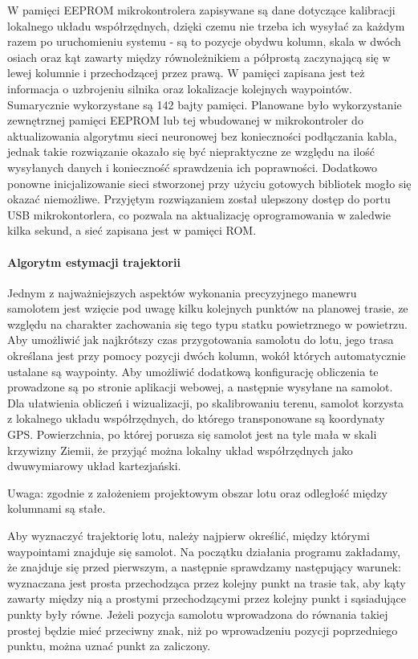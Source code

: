 \documentclass[12pt, a4paper]{article}
\begin{document}
W pamięci EEPROM mikrokontrolera zapisywane są dane dotyczące kalibracji lokalnego  układu współrzędnych, dzięki czemu nie trzeba ich wysyłać za każdym razem po uruchomieniu systemu - są to pozycje obydwu kolumn, skala w dwóch osiach oraz kąt zawarty między równoleżnikiem a półprostą zaczynającą się w lewej kolumnie i przechodzącej przez prawą. W pamięci zapisana jest też informacja o uzbrojeniu silnika oraz lokalizacje kolejnych waypointów. Sumarycznie wykorzystane są 142 bajty pamięci. Planowane było wykorzystanie zewnętrznej pamięci EEPROM lub tej wbudowanej w mikrokontroler do aktualizowania algorytmu sieci neuronowej bez konieczności podłączania kabla, jednak takie rozwiązanie okazało się być niepraktyczne ze względu na ilość wysyłanych danych i konieczność sprawdzenia ich poprawności. Dodatkowo ponowne inicjalizowanie sieci stworzonej przy użyciu gotowych bibliotek mogło się okazać niemożliwe. Przyjętym rozwiązaniem został ulepszony dostęp do portu USB mikrokontorlera, co pozwala na aktualizację oprogramowania w zaledwie kilka sekund, a sieć zapisana jest w pamięci ROM.

\FloatBarrier
\paragraph{Algorytm estymacji trajektorii}\mbox{}

Jednym z najważniejszych aspektów wykonania precyzyjnego manewru samolotem jest wzięcie pod uwagę kilku kolejnych punktów na planowej trasie, ze względu na charakter zachowania się tego typu statku powietrznego w powietrzu. Aby umożliwić jak najkrótszy czas przygotowania samolotu do lotu, jego trasa określana jest przy pomocy pozycji dwóch kolumn, wokół których automatycznie ustalane są waypointy. Aby umożliwić dodatkową konfigurację obliczenia te prowadzone są po stronie aplikacji webowej, a następnie wysyłane na samolot. Dla ułatwienia obliczeń i wizualizacji, po skalibrowaniu terenu, samolot korzysta z lokalnego układu współrzędnych, do którego transponowane są koordynaty GPS. Powierzchnia, po której porusza się samolot jest na tyle mała w skali krzywizny Ziemii, że przyjąć można lokalny układ współrzędnych jako dwuwymiarowy układ kartezjański. 

Uwaga: zgodnie z założeniem projektowym obszar lotu oraz odległość między kolumnami są stałe. 

Aby wyznaczyć trajektorię lotu, należy najpierw określić, między którymi waypointami znajduje się samolot. Na początku działania programu zakładamy, że znajduje się przed pierwszym, a następnie sprawdzamy następujący warunek: wyznaczana jest prosta przechodząca przez kolejny punkt na trasie tak, aby kąty zawarty między nią a prostymi przechodzącymi przez kolejny punkt i sąsiadujące punkty były równe. Jeżeli pozycja samolotu wprowadzona do równania takiej prostej będzie mieć przeciwny znak, niż po wprowadzeniu pozycji poprzedniego punktu, można uznać punkt za zaliczony. 
\end{document}
